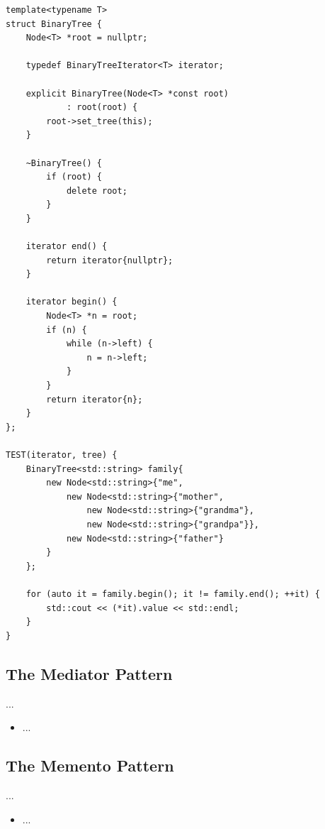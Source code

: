 \documentclass[11pt]{article}
\begin{document}
\begin{itemize}
\begin{multicols}{2}
\begin{lstlisting}
template<typename T>
struct BinaryTree {
    Node<T> *root = nullptr;

    typedef BinaryTreeIterator<T> iterator;

    explicit BinaryTree(Node<T> *const root)
            : root(root) {
        root->set_tree(this);
    }

    ~BinaryTree() {
        if (root) {
            delete root;
        }
    }

    iterator end() {
        return iterator{nullptr};
    }

    iterator begin() {
        Node<T> *n = root;
        if (n) {
            while (n->left) {
                n = n->left;
            }
        }
        return iterator{n};
    }
};

TEST(iterator, tree) {
    BinaryTree<std::string> family{
        new Node<std::string>{"me",
            new Node<std::string>{"mother",
                new Node<std::string>{"grandma"},
                new Node<std::string>{"grandpa"}},
            new Node<std::string>{"father"}
        }
    };

    for (auto it = family.begin(); it != family.end(); ++it) {
        std::cout << (*it).value << std::endl;
    }
}
            \end{lstlisting}
        \end{multicols}
    \end{itemize}

    \subsection{The Mediator Pattern}
    ...
    \begin{itemize}
        \item ...
    \end{itemize}

    \subsection{The Memento Pattern}
    ...
    \begin{itemize}
        \item ...
    \end{itemize}
\end{document}
